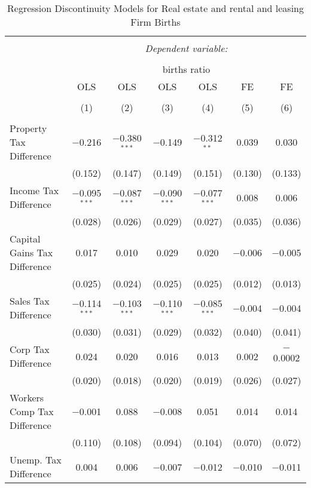 
\begin{table}[!htbp] \centering 
  \caption{Regression Discontinuity Models for  Real estate and rental and leasing Firm Births} 
  \label{53rd} 
\footnotesize 
\begin{tabular}{@{\extracolsep{5pt}}lcccccc} 
\\[-1.8ex]\hline 
\hline \\[-1.8ex] 
 & \multicolumn{6}{c}{\textit{Dependent variable:}} \\ 
\cline{2-7} 
\\[-1.8ex] & \multicolumn{6}{c}{births ratio} \\ 
 & OLS & OLS & OLS & OLS & FE & FE \\ 
\\[-1.8ex] & (1) & (2) & (3) & (4) & (5) & (6)\\ 
\hline \\[-1.8ex] 
 Property Tax Difference & $-$0.216 & $-$0.380$^{***}$ & $-$0.149 & $-$0.312$^{**}$ & 0.039 & 0.030 \\ 
  & (0.152) & (0.147) & (0.149) & (0.151) & (0.130) & (0.133) \\ 
  Income Tax Difference & $-$0.095$^{***}$ & $-$0.087$^{***}$ & $-$0.090$^{***}$ & $-$0.077$^{***}$ & 0.008 & 0.006 \\ 
  & (0.028) & (0.026) & (0.029) & (0.027) & (0.035) & (0.036) \\ 
  Capital Gains Tax Difference & 0.017 & 0.010 & 0.029 & 0.020 & $-$0.006 & $-$0.005 \\ 
  & (0.025) & (0.024) & (0.025) & (0.025) & (0.012) & (0.013) \\ 
  Sales Tax Difference & $-$0.114$^{***}$ & $-$0.103$^{***}$ & $-$0.110$^{***}$ & $-$0.085$^{***}$ & $-$0.004 & $-$0.004 \\ 
  & (0.030) & (0.031) & (0.029) & (0.032) & (0.040) & (0.041) \\ 
  Corp Tax Difference & 0.024 & 0.020 & 0.016 & 0.013 & 0.002 & $-$0.0002 \\ 
  & (0.020) & (0.018) & (0.020) & (0.019) & (0.026) & (0.027) \\ 
  Workers Comp Tax Difference & $-$0.001 & 0.088 & $-$0.008 & 0.051 & 0.014 & 0.014 \\ 
  & (0.110) & (0.108) & (0.094) & (0.104) & (0.070) & (0.072) \\ 
  Unemp. Tax Difference & 0.004 & 0.006 & $-$0.007 & $-$0.012 & $-$0.010 & $-$0.011 \\ 

\end{tabular}
\end{table}
